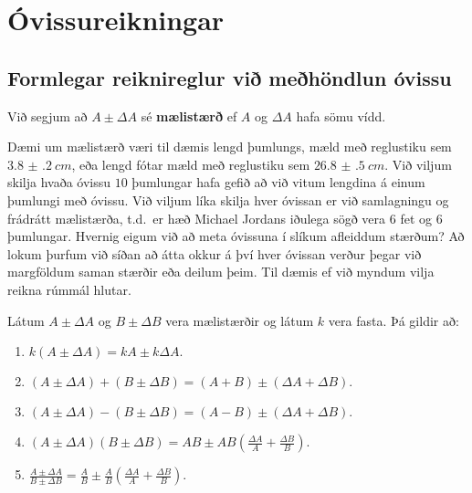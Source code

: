 
\chapter{Óvissureikningar}

\section{Formlegar reiknireglur við meðhöndlun óvissu}

\begin{tcolorbox}
\begin{definition}
Við segjum að $A \pm \Delta A$ sé \textbf{mælistærð} ef $A$ og $\Delta A$ hafa sömu vídd.
\end{definition}
\end{tcolorbox}

Dæmi um mælistærð væri til dæmis lengd þumlungs, mæld með reglustiku sem $\SI{3.8(2)}{cm}$, eða lengd fótar mæld með reglustiku sem $\SI{26.8(5)}{cm}$. Við viljum skilja hvaða óvissu $10$ þumlungar hafa gefið að við vitum lengdina á einum þumlungi með óvissu. Við viljum líka skilja hver óvissan er við samlagningu og frádrátt mælistærða, t.d.~er hæð Michael Jordans iðulega sögð vera 6 fet og 6 þumlungar.
Hvernig eigum við að meta óvissuna í slíkum afleiddum stærðum?
Að lokum þurfum við síðan að átta okkur á því hver óvissan verður þegar við margföldum saman stærðir eða deilum þeim. Til dæmis ef við myndum vilja reikna rúmmál hlutar.

\begin{tcolorbox}
\begin{setning} \label{Th:uncertain}
Látum $A \pm \Delta A$ og $B \pm \Delta B$ vera mælistærðir og látum $k$ vera fasta. Þá gildir að:
\begin{enumerate}[label = \textbf{(\roman*)}]
    \item $k(A\pm \Delta A) = k A \pm k \Delta A.$
    \item $(A \pm \Delta A) + (B \pm \Delta B) =  (A+B) \pm (\Delta A + \Delta B).$
    \item $(A \pm \Delta A) - (B \pm \Delta B) =  (A-B) \pm (\Delta A + \Delta B).$
    \item $(A \pm \Delta A)(B \pm \Delta B) =  AB \pm AB\left( \frac{\Delta A}{A} + \frac{\Delta B}{B} \right).$
    \item $\frac{A \pm \Delta A}{B \pm \Delta B} =  \frac{A}{B} \pm \frac{A}{B} \left( \frac{\Delta A}{A} + \frac{\Delta B}{B} \right).$
\end{enumerate}
\end{setning}
\end{tcolorbox}

